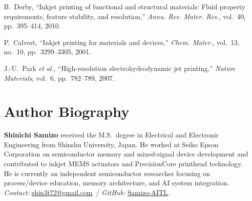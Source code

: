 \documentclass[conference]{IEEEtran}
\begin{document}
\begin{thebibliography}{99}
B.~Derby, ``Inkjet printing of functional and structural materials: Fluid property requirements, feature stability, and resolution,'' \emph{Annu. Rev. Mater. Res.}, vol.~40, pp.~395--414, 2010.

P.~Calvert, ``Inkjet printing for materials and devices,'' \emph{Chem. Mater.}, vol.~13, no.~10, pp.~3299--3305, 2001.

J.-U.~Park \emph{et al.}, ``High-resolution electrohydrodynamic jet printing,'' \emph{Nature Materials}, vol.~6, pp.~782--789, 2007.
\end{thebibliography}

\section*{Author Biography}
\textbf{Shinichi Samizo} received the M.S.\ degree in Electrical and Electronic Engineering from Shinshu University, Japan. He worked at Seiko Epson Corporation on semiconductor memory and mixed-signal device development and contributed to inkjet MEMS actuators and PrecisionCore printhead technology. He is currently an independent semiconductor researcher focusing on process/device education, memory architecture, and AI system integration. \emph{Contact:} \href{mailto:shin3t72@gmail.com}{shin3t72@gmail.com}\, / \emph{GitHub:} \href{https://github.com/Samizo-AITL}{Samizo-AITL}.
\end{document}
